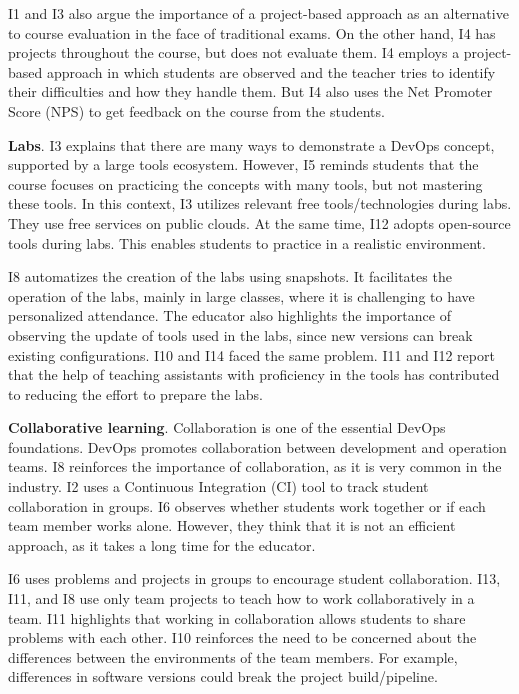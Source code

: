 \documentclass[10pt,conference]{IEEEtran}
\begin{document}
I1 and I3 also argue the importance of a project-based approach as an alternative to course evaluation in the face of traditional exams. On the other hand, I4 has projects throughout the course, but does not evaluate them. I4 employs a project-based approach in which students are observed and the teacher tries to identify their difficulties and how they handle them. But I4 also uses the Net Promoter Score (NPS) to get feedback on the course from the students.

{{\textbf{Labs}.}} I3 explains that there are many ways to demonstrate a DevOps concept, supported by a large tools ecosystem. However, I5 reminds students that the course focuses on practicing the concepts with many tools, but not mastering these tools. In this context, I3 utilizes relevant free tools/technologies during labs. They use free services on public clouds. At the same time, I12 adopts open-source tools during labs. This enables students to practice in a realistic environment.

I8 automatizes the creation of the labs using snapshots. It facilitates the operation of the labs, mainly in large classes, where it is challenging to have personalized attendance. The educator also highlights the importance of observing the update of tools used in the labs, since new versions can break existing configurations. I10 and I14 faced the same problem. I11 and I12 report that the help of teaching assistants with proficiency in the tools has contributed to reducing the effort to prepare the labs.

\textbf{Collaborative learning}. Collaboration is one of the essential DevOps foundations. DevOps promotes collaboration between development and operation teams. I8 reinforces the importance of collaboration, as it is very common in the industry. I2 uses a Continuous Integration (CI) tool to track student collaboration in groups. I6 observes whether students work together or if each team member works alone. However, they think that it is not an efficient approach, as it takes a long time for the educator.

I6 uses problems and projects in groups to encourage student collaboration. I13, I11, and I8 use only team projects to teach how to work collaboratively in a team. I11 highlights that working in collaboration allows students to share problems with each other. I10 reinforces the need to be concerned about the differences between the environments of the team members. For example, differences in software versions could break the project build/pipeline.
\end{document}
